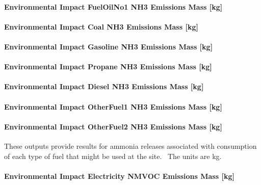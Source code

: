 \paragraph{Environmental Impact FuelOilNo1 NH3 Emissions Mass {[}kg{]}}\label{environmental-impact-fuel-oil-1-nh3-emissions-mass-kg}

\paragraph{Environmental Impact Coal NH3 Emissions Mass {[}kg{]}}\label{environmental-impact-coal-nh3-emissions-mass-kg}

\paragraph{Environmental Impact Gasoline NH3 Emissions Mass {[}kg{]}}\label{environmental-impact-gasoline-nh3-emissions-mass-kg}

\paragraph{Environmental Impact Propane NH3 Emissions Mass {[}kg{]}}\label{environmental-impact-propane-nh3-emissions-mass-kg}

\paragraph{Environmental Impact Diesel NH3 Emissions Mass {[}kg{]}}\label{environmental-impact-diesel-nh3-emissions-mass-kg}

\paragraph{Environmental Impact OtherFuel1 NH3 Emissions Mass {[}kg{]}}\label{environmental-impact-otherfuel1-nh3-emissions-mass-kg}

\paragraph{Environmental Impact OtherFuel2 NH3 Emissions Mass {[}kg{]}}\label{environmental-impact-otherfuel2-nh3-emissions-mass-kg}

These outputs provide results for ammonia releases associated with consumption of each type of fuel that might be used at the site.~ The units are kg.

\paragraph{Environmental Impact Electricity NMVOC Emissions Mass {[}kg{]}}\label{environmental-impact-electricity-nmvoc-emissions-mass-kg}

